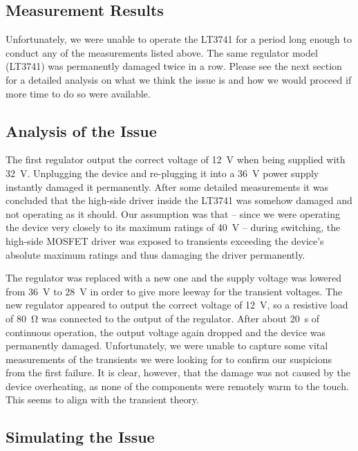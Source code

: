 \subsection{Measurement Results}

Unfortunately, we were unable to  operate the LT3741 for a period long enough to
conduct any of the measurements listed above.  The same regulator model (LT3741)
was  permanently  damaged  twice  in  a row. Please see the next section  for  a
detailed analysis on what we think the issue is and how we would proceed if more
time to do so were available.


\subsection{Analysis of the Issue}

The  first regulator output the correct voltage  of  \SI{12}{\volt}  when  being
supplied  with  \SI{32}{\volt}.  Unplugging the device and re-plugging it into a
\SI{36}{\volt}  power  supply  instantly  damaged  it  permanently.  After  some
detailed measurements it  was  concluded  that  the  high-side driver inside the
LT3741  was somehow damaged and not operating as it should. Our  assumption  was
that -- since we were  operating  the device very closely to its maximum ratings
of  \SI{40}{\volt} -- during switching, the high-side MOSFET driver was  exposed
to transients exceeding the device's absolute maximum ratings  and thus damaging
the driver permanently.

The regulator was replaced  with a new one and the  supply voltage was lowered
from \SI{36}{\volt}  to \SI{28}{\volt} in  order to  give more leeway  for the
transient voltages. The new  regulator appeared to output  the correct voltage
of  \SI{12}{\volt}, so  a resistive  load  of \SI{80}{\ohm}  was connected  to
the  output of  the  regulator.  After  about  \SI{20}{\second} of  continuous
operation, the  output voltage  again dropped and  the device  was permanently
damaged. Unfortunately, we were  unable to capture some  vital measurements of
the transients  we were looking for  to confirm our suspicions  from the first
failure.  It is clear,  however, that the damage was not  caused by the device
overheating, as none  of the components were remotely warm  to the touch. This
seems to align with the transient theory.


\subsection{Simulating the Issue}

